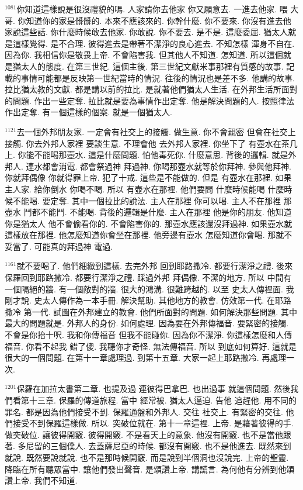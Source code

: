 \documentclass{book}
\begin{document}
$^{1081}$你知道這樣說是很沒禮貌的嗎.
人家請你去他家 你又願意去.
一進去他家.
喂 大哥.
你知道你的家是髒髒的.
本來不應該來的.
你幹什麼.
你不要來.
你沒有進去他家說這些話.
你什麼時候敢去他家.
你敢說.
你不要去.
是不是.
這麼委屈.
猶太人就是這樣覺得.
是不合理.
彼得進去是帶著不潔淨的良心進去.
不知怎樣 渾身不自在.
因為你.
我相信你是敬畏上帝.
不會陷害我.
但其他人不知道.
怎知道.
所以這個就是猶太人的態度.
在第三世紀.
這個主後.
第三世紀文獻米事那裡有質感的故事.
記載的事情可能都是反映第一世紀當時的情況.
往後的情況也是差不多.
他講的故事.
拉比猶太教的文獻.
都是講以前的拉比.
是就著他們猶太人生活.
在外邦生活所面對的問題.
作出一些定奪.
拉比就是要為事情作出定奪.
他是解決問題的人.
按照律法作出定奪.
有一個這樣的個案.
就是一個猶太人.

$^{1121}$去一個外邦朋友家.
一定會有社交上的接觸.
做生意.
你不會親密 但會在社交上接觸.
你去外邦人家裡 要談生意.
不理會他 去外邦人家裡.
你坐下了 有壺水在茶几上.
你能不能喝那壺水.
這是什麼問題.
怕他毒死你.
什麼意思.
背後的邏輯.
就是外邦人.
連水都會消電.
都會祭過神 拜過神.
你喝那壺水就等於你拜神.
參與他拜神.
你就拜偶像 你就得罪上帝.
犯了十戒.
這些是不能做的.
但是 有壺水在那裡.
如果主人家.
給你倒水 你喝不喝.
所以 有壺水在那裡.
他們要問 什麼時候能喝 什麼時候不能喝.
要定奪.
其中一個拉比的說法.
主人在那裡 你可以喝.
主人不在那裡 那壺水 鬥都不能鬥.
不能喝.
背後的邏輯是什麼.
主人在那裡 他是你的朋友.
他知道你是猶太人 他不會偷看你的.
不會陷害你的.
那壺水應該還沒拜過神.
如果壺水就這樣放在那裡.
他怎麼知道你會坐在那裡.
他旁邊有壺水 怎麼知道你會喝.
那就不妥當了.
可能真的拜過神 電過.

$^{1161}$就不要喝了.
他們細緻到這樣.
去完外邦 回到耶路撒冷.
都要行潔淨之禮.
後來保羅回到耶路撒冷.
都要行潔淨之禮.
踩過外邦 拜偶像.
不潔的地方.
所以 中間有一個隔絕的牆.
有一個敵對的牆.
很大的鴻溝.
很難跨越的.
以至 史太人傳裡面.
我剛才說.
史太人傳作為一本手冊.
解決幫助.
其他地方的教會.
仿效第一代.
在耶路撒冷 第一代.
試圖在外邦建立的教會.
他們所面對的問題.
如何解決那些問題.
其中最大的問題就是.
外邦人的身份.
如何處理.
因為要在外邦傳福音.
要緊密的接觸.
不會是你抬十呎.
我和你傳福音 但我不能碰你.
因為你不潔淨.
你這樣怎麼和人傳福音.
你看不起我 錯了傻.
我聽你才奇怪.
無法傳福音.
所以 到底如何算好.
這就是很大的一個問題.
在第十一章處理過.
到第十五章.
大家一起上耶路撒冷.
再處理一次.

$^{1201}$保羅在加拉太書第二章.
也提及過 連彼得巴拿巴.
也出過事 就這個問題.
然後我們看第十三章.
保羅的傳道旅程.
當中 經常被.
猶太人逼迫.
告他 追趕他.
用不同的罪名.
都是因為他們接受不到.
保羅通盤和外邦人.
交往 社交上.
有緊密的交往.
他們接受不到保羅這樣做.
所以.
突破位就在.
第十一章這裡.
上帝.
是藉著彼得的手.
做突破位.
讓彼得開竅.
彼得開竅.
不是看天上的意象.
他沒有開竅.
也不是當他跟著.
多尼留的三個僕人.
去蓋薩尼亞的時候.
都沒有開竅.
也不是他進去.
既然來到就說.
既然要說就說.
也不是那時候開竅.
而是說到半個洞也沒說完.
上帝的聖靈.
降臨在所有聽眾當中.
讓他們發出聲音.
是頌讚上帝.
講謊言.
為何他有分辨到他頌讚上帝.
我們不知道.
\end{document}
